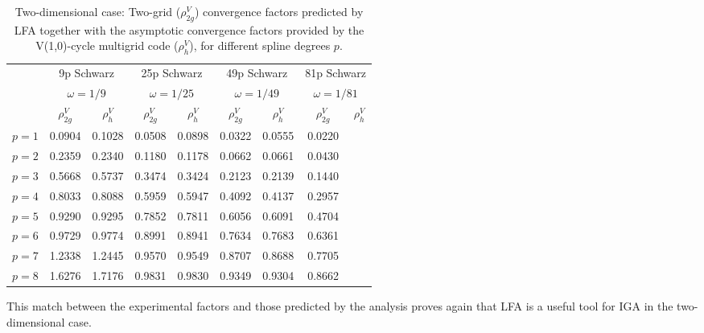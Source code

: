 \documentclass{article}
\begin{document}
\begin{table}[htb]
	\begin{center}
		\begin{tabular}{ccccccccc}
			\cline{2-9}
			& \multicolumn{2}{c}{9p Schwarz} & \multicolumn{2}{c}{25p Schwarz} & \multicolumn{2}{c}{49p Schwarz} & \multicolumn{2}{c}{81p Schwarz}\\
			& \multicolumn{2}{c}{$\omega = 1/9$} & \multicolumn{2}{c}{$\omega = 1/25$} & \multicolumn{2}{c}{$\omega = 1/49$} & \multicolumn{2}{c}{$\omega = 1/81$}\\
			\cline{2-9}
			& $\rho^V_{2g}$ & $\rho^V_h$ & $\rho^V_{2g}$ & $\rho^V_h$ & $\rho^V_{2g}$ & $\rho^V_h$ & $\rho^V_{2g}$ & $\rho^V_h$\\
			\hline
			$p = 1$ & 0.0904  & 0.1028 &  0.0508 & 0.0898   & 0.0322  & 0.0555  & 0.0220 &    \\
			$p = 2$ & 0.2359  & 0.2340 & 0.1180  & 0.1178   & 0.0662  & 0.0661  & 0.0430 &    \\
			$p = 3$ & 0.5668  & 0.5737 & 0.3474  & 0.3424   & 0.2123  & 0.2139  & 0.1440 &    \\
			$p = 4$ & 0.8033  & 0.8088 & 0.5959  & 0.5947   & 0.4092  & 0.4137  & 0.2957 &    \\
			$p = 5$ & 0.9290  & 0.9295 & 0.7852  & 0.7811   & 0.6056  & 0.6091  & 0.4704 &    \\
			$p = 6$ & 0.9729  & 0.9774 & 0.8991  & 0.8941   & 0.7634  & 0.7683  & 0.6361 &    \\
			$p = 7$ & 1.2338  & 1.2445 & 0.9570  & 0.9549   & 0.8707  & 0.8688  & 0.7705 &    \\
			$p = 8$ & 1.6276  & 1.7176 & 0.9831  & 0.9830   & 0.9349  & 0.9304  & 0.8662 &    \\
			\hline
		\end{tabular}
		\caption{Two-dimensional case: Two-grid ($\rho^V_{2g}$) convergence factors predicted by LFA together with the asymptotic convergence factors provided by the V(1,0)-cycle multigrid code ($\rho^V_h$), for different spline degrees $p$.}
		\label{table_LFA_Schwarz_2D}
	\end{center}
\end{table}

This match between the experimental factors and those predicted by the analysis proves again that LFA is a useful tool for IGA in the two-dimensional case. 


\end{document}
